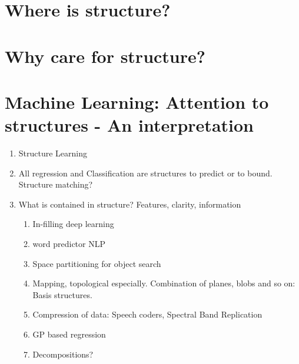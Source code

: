 \section{Where is structure?}
\section{Why care for structure?}
\section{Machine Learning: Attention to structures - An interpretation}
\begin{enumerate}
\item Structure Learning
\item All regression and Classification are structures to predict or to bound. Structure matching?
\item What is contained in structure? Features, clarity, information
\begin{enumerate}
\item In-filling deep learning
\item word predictor NLP
\item Space partitioning for object search
\item Mapping, topological especially. Combination of planes, blobs and so on: Basis structures.
\item Compression of data: Speech coders, Spectral Band Replication
\item GP based regression
\item Decompositions?
\end{enumerate}
\end{enumerate}

